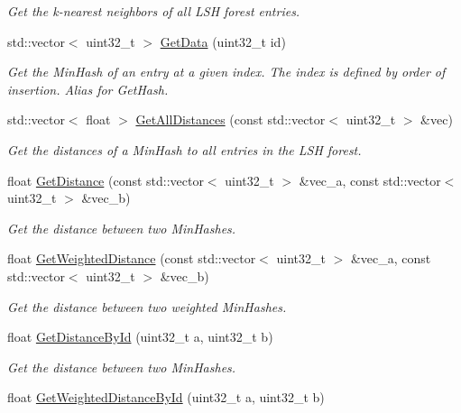 \begin{DoxyCompactItemize}
\begin{DoxyCompactList}\small\item\em Get the k-\/nearest neighbors of all L\+SH forest entries. \end{DoxyCompactList}\item 
std\+::vector$<$ uint32\+\_\+t $>$ \hyperlink{classLSHForest_aad89848405eebc847c18a75b618da3e1}{Get\+Data} (uint32\+\_\+t id)
\begin{DoxyCompactList}\small\item\em Get the Min\+Hash of an entry at a given index. The index is defined by order of insertion. Alias for Get\+Hash. \end{DoxyCompactList}\item 
std\+::vector$<$ float $>$ \hyperlink{classLSHForest_abdc3bd3357708bb58e6d957376e92f1c}{Get\+All\+Distances} (const std\+::vector$<$ uint32\+\_\+t $>$ \&vec)
\begin{DoxyCompactList}\small\item\em Get the distances of a Min\+Hash to all entries in the L\+SH forest. \end{DoxyCompactList}\item 
float \hyperlink{classLSHForest_a08d66568664bdc8e0148c18b18a1b8fa}{Get\+Distance} (const std\+::vector$<$ uint32\+\_\+t $>$ \&vec\+\_\+a, const std\+::vector$<$ uint32\+\_\+t $>$ \&vec\+\_\+b)
\begin{DoxyCompactList}\small\item\em Get the distance between two Min\+Hashes. \end{DoxyCompactList}\item 
float \hyperlink{classLSHForest_acfb878c731daf8da6402e7cebc2b6ef1}{Get\+Weighted\+Distance} (const std\+::vector$<$ uint32\+\_\+t $>$ \&vec\+\_\+a, const std\+::vector$<$ uint32\+\_\+t $>$ \&vec\+\_\+b)
\begin{DoxyCompactList}\small\item\em Get the distance between two weighted Min\+Hashes. \end{DoxyCompactList}\item 
float \hyperlink{classLSHForest_a49ad1fe0429121a8b572cde4df973d96}{Get\+Distance\+By\+Id} (uint32\+\_\+t a, uint32\+\_\+t b)
\begin{DoxyCompactList}\small\item\em Get the distance between two Min\+Hashes. \end{DoxyCompactList}\item 
float \hyperlink{classLSHForest_a72b5a201bc8c409c0c5742587988ba85}{Get\+Weighted\+Distance\+By\+Id} (uint32\+\_\+t a, uint32\+\_\+t b)

\end{DoxyCompactItemize}
